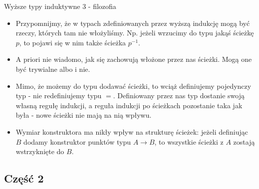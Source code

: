 \documentclass{beamer}
\begin{document}
\begin{frame}{Wyższe typy induktywne 3 - filozofia}
\begin{itemize}
	\item Przypomnijmy, że w typach zdefiniowanych przez wyższą indukcję mogą być rzeczy, których tam nie włożyliśmy. Np. jeżeli wrzucimy do typu jakąś ścieżkę $p$, to pojawi się w nim także ścieżka $p^{-1}$.
	\item A priori nie wiadomo, jak się zachowują włożone przez nas ścieżki. Mogą one być trywialne albo i nie.
	\item Mimo, że możemy do typu dodawać ścieżki, to wciąż definiujemy pojedynczy typ - nie redefiniujemy typu $=$. Definiowany przez nas typ dostanie swoją własną regułę indukcji, a reguła indukcji po ścieżkach pozostanie taka jak była - nowe ścieżki nie mają na nią wpływu.
	\item Wymiar konstruktora ma nikły wpływ na strukturę ścieżek: jeżeli definiując $B$ dodamy konstruktor punktów typu $A \to B$, to wszystkie ścieżki z $A$ zostają wstrzyknięte do $B$.
\end{itemize}
\end{frame}

\subsection{Część 2}
\end{document}
